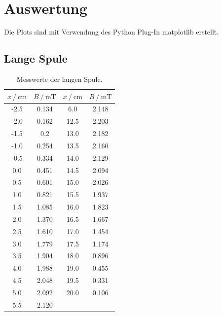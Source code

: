 \section{Auswertung}
\label{sec:Auswertung}
Die Plots sind mit Verwendung des Python Plug-In matplotlib \cite{matplotlib} erstellt.
\subsection{Lange Spule}

\FloatBarrier

\begin{table}
\centering
\caption{Messwerte der langen Spule.}
\begin{tabular}{cc|cc}
  \toprule
  $x \:/\: \si{\centi\meter}$ & $B \:/\: \si{\milli\tesla}$ & $x \:/\: \si{\centi\meter}$ & $B \:/\: \si{\milli\tesla}$ \\
  \midrule
  -2.5 & 0.134 &  6.0 & 2.148  \\
  -2.0 & 0.162 & 12.5 & 2.203 \\
  -1.5 & 0.2 &  13.0 & 2.182 \\
  -1.0 & 0.254 & 13.5 & 2.160 \\
  -0.5 & 0.334 &  14.0 & 2.129 \\ 
  0.0 & 0.451  & 14.5 & 2.094 \\
  0.5 & 0.601 & 15.0 & 2.026 \\
  1.0 & 0.821  & 15.5 & 1.937 \\
  1.5 & 1.085  & 16.0 & 1.823 \\
  2.0 & 1.370  & 16.5 & 1.667 \\
  2.5 & 1.610  &  17.0 & 1.454 \\
  3.0 & 1.779  & 17.5 & 1.174 \\
  3.5 & 1.904  & 18.0 & 0.896 \\
  4.0 & 1.988 & 19.0 & 0.455 \\
  4.5 & 2.048  &  19.5 & 0.331 \\
  5.0 & 2.092  & 20.0 & 0.106 \\
  5.5 & 2.120 & & \\
  \bottomrule
\end{tabular}
\label{tab:long}
\end{table}


